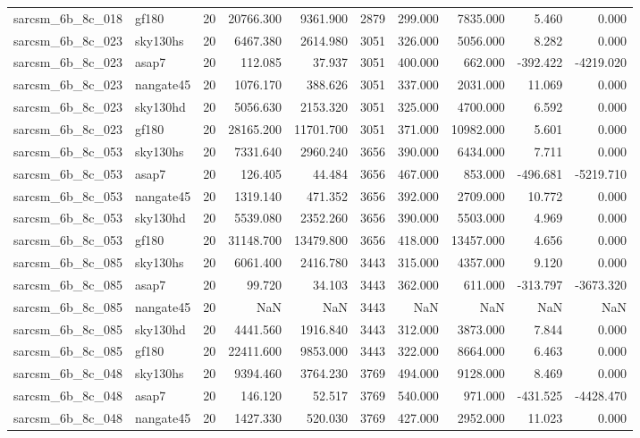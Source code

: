 \documentclass{article}
\begin{document}
\begin{longtable}{llrrrrrrrr}
sarcsm\_6b\_8c\_018 & gf180 & 20 & 20766.300 & 9361.900 & 2879 & 299.000 & 7835.000 & 5.460 & 0.000 \\
sarcsm\_6b\_8c\_023 & sky130hs & 20 & 6467.380 & 2614.980 & 3051 & 326.000 & 5056.000 & 8.282 & 0.000 \\
sarcsm\_6b\_8c\_023 & asap7 & 20 & 112.085 & 37.937 & 3051 & 400.000 & 662.000 & -392.422 & -4219.020 \\
sarcsm\_6b\_8c\_023 & nangate45 & 20 & 1076.170 & 388.626 & 3051 & 337.000 & 2031.000 & 11.069 & 0.000 \\
sarcsm\_6b\_8c\_023 & sky130hd & 20 & 5056.630 & 2153.320 & 3051 & 325.000 & 4700.000 & 6.592 & 0.000 \\
sarcsm\_6b\_8c\_023 & gf180 & 20 & 28165.200 & 11701.700 & 3051 & 371.000 & 10982.000 & 5.601 & 0.000 \\
sarcsm\_6b\_8c\_053 & sky130hs & 20 & 7331.640 & 2960.240 & 3656 & 390.000 & 6434.000 & 7.711 & 0.000 \\
sarcsm\_6b\_8c\_053 & asap7 & 20 & 126.405 & 44.484 & 3656 & 467.000 & 853.000 & -496.681 & -5219.710 \\
sarcsm\_6b\_8c\_053 & nangate45 & 20 & 1319.140 & 471.352 & 3656 & 392.000 & 2709.000 & 10.772 & 0.000 \\
sarcsm\_6b\_8c\_053 & sky130hd & 20 & 5539.080 & 2352.260 & 3656 & 390.000 & 5503.000 & 4.969 & 0.000 \\
sarcsm\_6b\_8c\_053 & gf180 & 20 & 31148.700 & 13479.800 & 3656 & 418.000 & 13457.000 & 4.656 & 0.000 \\
sarcsm\_6b\_8c\_085 & sky130hs & 20 & 6061.400 & 2416.780 & 3443 & 315.000 & 4357.000 & 9.120 & 0.000 \\
sarcsm\_6b\_8c\_085 & asap7 & 20 & 99.720 & 34.103 & 3443 & 362.000 & 611.000 & -313.797 & -3673.320 \\
sarcsm\_6b\_8c\_085 & nangate45 & 20 & NaN & NaN & 3443 & NaN & NaN & NaN & NaN \\
sarcsm\_6b\_8c\_085 & sky130hd & 20 & 4441.560 & 1916.840 & 3443 & 312.000 & 3873.000 & 7.844 & 0.000 \\
sarcsm\_6b\_8c\_085 & gf180 & 20 & 22411.600 & 9853.000 & 3443 & 322.000 & 8664.000 & 6.463 & 0.000 \\
sarcsm\_6b\_8c\_048 & sky130hs & 20 & 9394.460 & 3764.230 & 3769 & 494.000 & 9128.000 & 8.469 & 0.000 \\
sarcsm\_6b\_8c\_048 & asap7 & 20 & 146.120 & 52.517 & 3769 & 540.000 & 971.000 & -431.525 & -4428.470 \\
sarcsm\_6b\_8c\_048 & nangate45 & 20 & 1427.330 & 520.030 & 3769 & 427.000 & 2952.000 & 11.023 & 0.000 \\

\end{longtable}
\end{document}
